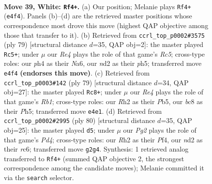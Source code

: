 \documentclass[11pt]{article}
\begin{document}
\clearpage

\begin{figure}[p]\centering
\begin{subfigure}{0.46\textwidth}\centering
\resizebox{\linewidth}{!}{%
\newchessgame
\chessboard[
  setfen={r1b2k2/8/8/1r6/4R2p/7P/p2n2PR/K7 w - - 0 39},
  showmover=false,
  pgfstyle=straightmove, color=movearrow, markmove={e4-f4}
]}
\caption{}
\end{subfigure}\hfill
\begin{subfigure}{0.46\textwidth}\centering
\resizebox{\linewidth}{!}{%
\newchessgame
\chessboard[
  setfen={r7/p3k1p1/np6/4K2P/P1r5/6R1/3B4/7R b - - 0 40},
  showmover=false,
  pgfstyle=straightmove, color=movearrow, markmove={c4-c5}
]}
\caption{}
\end{subfigure}
\\[4pt]
\begin{subfigure}{0.46\textwidth}\centering
\resizebox{\linewidth}{!}{%
\newchessgame
\chessboard[
  setfen={1r4k1/3N1pP1/p7/1p1R3p/8/2K4P/8/8 b - - 0 40},
  showmover=false,
  pgfstyle=straightmove, color=movearrow, markmove={b8-c8}
]}
\caption{}
\end{subfigure}\hfill
\begin{subfigure}{0.46\textwidth}\centering
\resizebox{\linewidth}{!}{%
\newchessgame
\chessboard[
  setfen={6k1/2NR4/2r1pbpp/8/3P1P2/8/5P2/6K1 w - - 2 41},
  showmover=false,
  pgfstyle=straightmove, color=movearrow, markmove={d4-d5}
]}
\caption{}
\end{subfigure}
\caption{\textbf{Move 39, White: \texttt{Rf4+}.} (a) Our position; Melanie plays \texttt{Rf4+} (\texttt{e4f4}). Panels (b)--(d) are the retrieved master positions whose correspondence most drove this move (highest QAP objective among those that transfer to it). (b) Retrieved from \texttt{ccrl\_top\_p0002\#3575} (ply 79) [structural distance $d$=35, QAP obj=2]: the master played \texttt{Rc5+}; under $\mu$ our \emph{Re4} plays the role of that game's \emph{Rc5}; cross-type roles: our \emph{p}h4 as their \emph{N}a6, our \emph{n}d2 as their \emph{p}h5; transferred move \texttt{e4f4} \textbf{(endorses this move)}. (c) Retrieved from \texttt{ccrl\_top\_p0003\#142} (ply 79) [structural distance $d$=34, QAP obj=27]: the master played \texttt{Rc8+}; under $\mu$ our \emph{Re4} plays the role of that game's \emph{Rb1}; cross-type roles: our \emph{R}h2 as their \emph{P}b5, our \emph{b}c8 as their \emph{P}h5; transferred move \texttt{e4e1}. (d) Retrieved from \texttt{ccrl\_top\_p0002\#2995} (ply 80) [structural distance $d$=35, QAP obj=25]: the master played \texttt{d5}; under $\mu$ our \emph{Pg2} plays the role of that game's \emph{Pd4}; cross-type roles: our \emph{R}h2 as their \emph{P}f4, our \emph{n}d2 as their \emph{r}c6; transferred move \texttt{g2g4}. Synthesis: 1 retrieved analog transferred to \texttt{Rf4+} (summed QAP objective 2, the strongest correspondence among the candidate moves); Melanie committed it via the \texttt{search} selector.}
\label{fig:thought-m76}
\end{figure}
\end{document}
